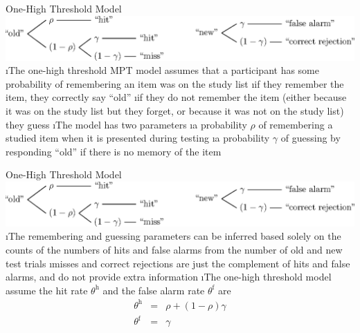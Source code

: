 \documentclass[10pt]{beamer}
\begin{document}
\begin{frame}[fragile]{One-High Threshold Model}
\includegraphics[width = \textwidth]{figures/oneHighThreshold.eps}
\vspace{0.5em}
\bi
\i The one-high threshold MPT model assumes that a participant has some probability of remembering an item was on the study list
\bi
\i if they remember the item, they correctly say ``old''
\i if they do not remember the item (either because it was on the study list but they forget, or because it was not on the study list) they guess
\ei
\i The model has two parameters
\bi
\i a probability $\rho$ of remembering a studied item when it is presented during testing
\i a probability $\gamma$ of guessing by responding ``old'' if there is no memory of the item
\ei
\ei
\end{frame}

\begin{frame}[fragile]{One-High Threshold Model}
\includegraphics[width = \textwidth]{figures/oneHighThreshold.eps}
\vspace{0.5em}
\bi
\i The remembering and guessing parameters can be inferred based solely on the counts of the numbers of hits and false alarms from the number of old and new test trials
\bi
\i misses and correct rejections are just the complement of hits and false alarms, and do not provide extra information
\ei
\i The one-high threshold model assume the hit rate $\theta^\mathrm{h}$ and the false alarm rate $\theta^\mathrm{f}$ are
\begin{eqnarray}
 \theta^\mathrm{h} &=& \rho + \left(1-\rho\right)\gamma \nonumber\\
 \theta^\mathrm{f} &=& \gamma \nonumber
\end{eqnarray}
\ei
\end{frame}
\end{document}
